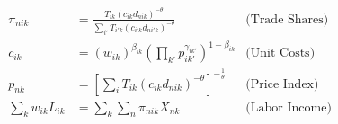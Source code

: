 \begin{align*}
    \pi_{nik} &= \frac{T_{ik} (c_{ik} d_{nik})^{-\theta}}{\sum_{i'} T_{i'k} (c_{i'k} d_{ni'k})^{-\theta}} & \text{(Trade Shares)} \\
    c_{ik} &= (w_{ik})^{\beta_{ik}} \left(\prod_{k'} p_{ik'}^{\gamma_{ik'}}\right)^{1 - \beta_{ik}} & \text{(Unit Costs)} \\
    p_{nk} &= \left[ \sum_{i} T_{ik} (c_{ik} d_{nik})^{-\theta} \right]^{-\frac{1}{\theta}} & \text{(Price Index)} \\
   \sum_{k} w_{ik} L_{ik} &= \sum_{k} \sum_{n} \pi_{nik} X_{nk} & \text{(Labor Income)} \\
\end{align*}
